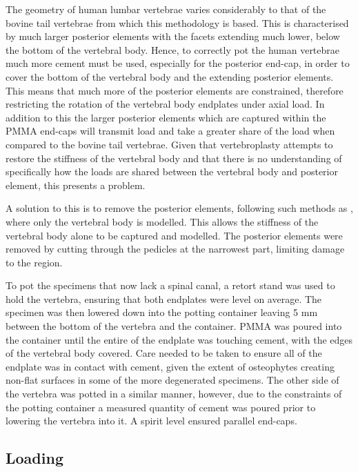 The geometry of human lumbar vertebrae varies considerably to that of the
bovine
tail vertebrae from which this methodology is based. This is characterised by
much larger posterior elements with the facets extending much lower, below the
bottom of the vertebral body. Hence, to correctly pot the human vertebrae much
more cement must be used, especially for the posterior end-cap, in order to
cover the bottom of the vertebral body and the extending posterior elements.
This means that much more of the posterior elements are constrained, therefore
restricting the rotation of the vertebral body endplates under axial load. In
addition to this the larger posterior elements which are captured within the
PMMA end-caps will transmit load and take a greater share of the load when
compared to the bovine tail vertebrae. Given that vertebroplasty attempts to
restore the stiffness of the vertebral body and that there is no understanding
of specifically how the loads are shared between the vertebral body and
posterior element, this presents a problem.

A solution to this is to remove the posterior elements, following such methods
as \cite{Wijayathunga2008,RobsonBrown2014}, where only the vertebral body is
modelled. This allows the stiffness of the vertebral body alone to be captured
and modelled. The posterior elements were removed by cutting through the
pedicles at the narrowest part, limiting damage to the region.

To pot the specimens that now lack a spinal canal, a retort stand was used to
hold the vertebra, ensuring that both endplates were level on average. The
specimen was then lowered down into the potting container leaving 5 mm between
the bottom of the vertebra and the container. PMMA was poured into the
container
until the entire of the endplate was touching cement, with the edges of the
vertebral body covered. Care needed to be taken to ensure all of the endplate
was in contact with cement, given the extent of osteophytes creating non-flat
surfaces in some of the more degenerated specimens. The other side of the
vertebra was potted in a similar manner, however, due to the constraints of the
potting container a measured quantity of cement was poured prior to lowering
the
vertebra into it. A spirit level ensured parallel end-caps.

\subsection{Loading}

